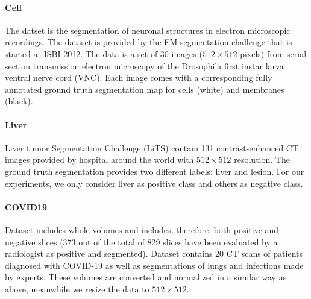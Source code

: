 \documentclass[UTF8]{article} %
\begin{document}
\paragraph{Cell}
The datset is the segmentation of neuronal structures in electron microscopic recordings.
The dataset is provided by the EM segmentation challenge\cite{isbicell} that is started at ISBI 2012.
The data is a set of 30 images ($512\times 512$ pixels) from serial section transmission electron
microscopy of the Drosophila first instar larva ventral nerve cord (VNC). Each image comes with a corresponding fully annotated ground truth segmentation
map for cells (white) and membranes (black).

\paragraph{Liver}
Liver tumor Segmentation Challenge (LiTS)\cite{liver} contain 131 contrast-enhanced CT images provided by hospital around the world with \(512 \times 512\) resolution.
The ground truth segmentation provides two different labels: liver and lesion. For our experiments,
we only consider liver as positive class and others as negative class.


\paragraph{COVID19}
Dataset\cite{covid19} includes whole volumes and includes, therefore, both positive and negative slices 
(373 out of the total of 829 slices have been evaluated by a radiologist as positive and segmented). 
Dataset\cite{covid19_2} contains 20 CT scans of patients diagnosed with COVID-19 as well as segmentations of lungs and infections made by experts.
These volumes are converted and normalized in a similar way as above, meanwhile we resize the data to $512\times 512$.
\end{document}
